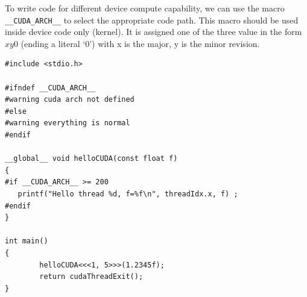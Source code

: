\begin{framed}
To write code for different device compute capability, we can use the macro
\verb!__CUDA_ARCH__! to select the appropriate code path. This macro should be
used inside device code only (kernel). It is assigned one of the three value in
the form $xy0$ (ending a literal `0') with x is the major, y is the minor
revision.

\begin{lstlisting}
#include <stdio.h>

#ifndef __CUDA_ARCH__
#warning cuda arch not defined 
#else
#warning everything is normal
#endif

__global__ void helloCUDA(const float f) 
{ 
#if __CUDA_ARCH__ >= 200
   printf("Hello thread %d, f=%f\n", threadIdx.x, f) ; 
#endif
} 

int main() 
{ 
        helloCUDA<<<1, 5>>>(1.2345f); 
        return cudaThreadExit(); 
}
\end{lstlisting}
\end{framed}

% 
% 
% 

